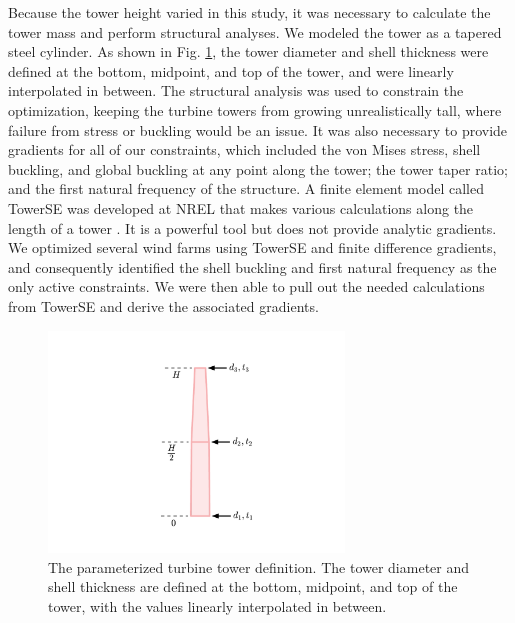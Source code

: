 Because the tower height varied in this study, it was necessary to calculate the tower mass and perform structural analyses.
We modeled the tower as a tapered steel cylinder. As shown in Fig. \ref{tower_def}, the tower diameter and shell thickness were defined at the bottom, midpoint, and top of the tower, and were linearly interpolated in between.
The structural analysis was used to constrain the optimization, keeping the turbine towers from growing unrealistically tall, where failure from stress or buckling would be an issue. 
It was also necessary to provide gradients for all of our constraints, which included the von Mises stress, shell buckling, and global buckling at any point along the tower; the tower taper ratio; and the first natural frequency of the structure. A finite element model called TowerSE was developed at NREL that makes various calculations along the length of a tower \citep{ning2013towerse}. 
It is a powerful tool but does not provide analytic gradients. We optimized several wind farms using TowerSE and finite difference gradients, and consequently identified the shell buckling and first natural frequency as the only active constraints. We were then able to pull out the needed calculations from TowerSE and derive the associated gradients. 

\begin{figure}[htbp]
  \centering
  \includegraphics[width=0.7\textwidth]{Figures/tower_param.pdf}
  \caption{\label{tower_def} The parameterized turbine tower definition. The tower diameter and shell thickness are defined at the bottom, midpoint, and top of the tower, with the values linearly interpolated in between.}
\end{figure}

